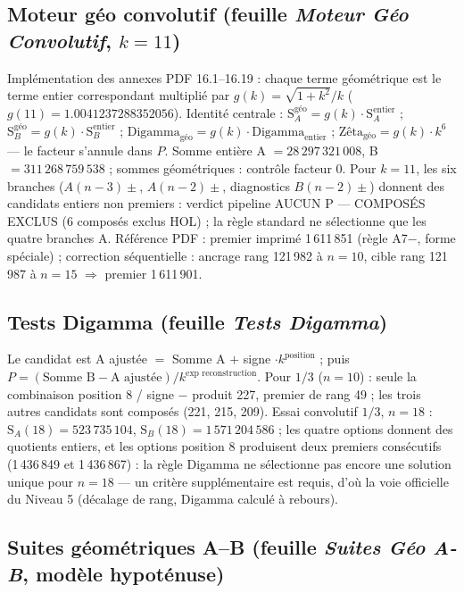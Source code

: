 \documentclass[11pt,a4paper]{article}
\newcommand{\SA}{\mathrm{S}_A}
\newcommand{\SB}{\mathrm{S}_B}
\begin{document}
\subsection{Moteur géo convolutif (feuille \emph{Moteur Géo Convolutif}, \texorpdfstring{$k = 11$}{k = 11})}
Implémentation des annexes PDF 16.1--16.19 : chaque terme géométrique est le
terme entier correspondant multiplié par $g(k) = \sqrt{1+k^{2}}/k$
($g(11) = 1.0041237288352056$). Identité centrale :
$\SA^{\text{géo}} = g(k)\cdot\SA^{\text{entier}}$ ;
$\SB^{\text{géo}} = g(k)\cdot\SB^{\text{entier}}$ ;
$\text{Digamma}_{\text{géo}} = g(k)\cdot\text{Digamma}_{\text{entier}}$ ;
$\text{Zêta}_{\text{géo}} = g(k)\cdot k^{6}$ --- le facteur s'annule dans $P$.
Somme entière A $= 28\,297\,321\,008$, B $= 311\,268\,759\,538$ ; sommes
géométriques : contrôle facteur 0. Pour $k = 11$, les six branches
($A(n{-}3)\pm$, $A(n{-}2)\pm$, diagnostics $B(n{-}2)\pm$) donnent des candidats
entiers non premiers : verdict pipeline \og AUCUN P --- COMPOSÉS EXCLUS \fg{}
(6 composés exclus HOL) ; la règle standard ne sélectionne que les quatre
branches A. Référence PDF : premier imprimé 1\,611\,851 (règle A7$-$, forme
spéciale) ; correction séquentielle : ancrage rang 121\,982 à $n=10$, cible
rang 121\,987 à $n=15$ $\Rightarrow$ premier 1\,611\,901.

\subsection{Tests Digamma (feuille \emph{Tests Digamma})}

Le candidat est A ajustée $=$ Somme A $+$ signe $\cdot k^{\text{position}}$ ;
puis $P = (\text{Somme B} - \text{A ajustée})/k^{\text{exp reconstruction}}$.
Pour $1/3$ ($n=10$) : seule la combinaison position 8 / signe $-$ produit 227,
premier de rang 49 ; les trois autres candidats sont composés (221, 215, 209).
Essai convolutif $1/3$, $n = 18$ : $\SA(18) = 523\,735\,104$,
$\SB(18) = 1\,571\,204\,586$ ; les quatre options donnent des quotients
entiers, et les options position 8 produisent deux premiers consécutifs
(1\,436\,849 et 1\,436\,867) : la règle Digamma ne sélectionne pas encore une
solution unique pour $n = 18$ --- un critère supplémentaire est requis, d'où la
voie officielle du Niveau 5 (décalage de rang, Digamma calculé à rebours).

\subsection{Suites géométriques A--B (feuille \emph{Suites Géo A-B}, modèle hypoténuse)}
\end{document}
